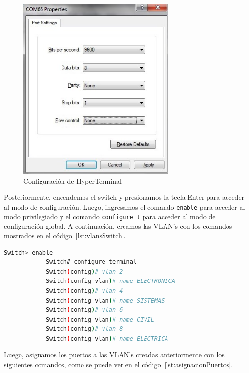         \begin{figure}[H]
            \centering
            \includegraphics[width=0.7\textwidth]{img/HyperTerminal.jpg}
            \caption{Configuración de HyperTerminal}
            \label{fig:HyperTerminal}
        \end{figure}

        Posteriormente, encendemos el switch y presionamos la tecla Enter para acceder al modo de configuración. Luego, ingresamos el comando \texttt{enable} para acceder al modo privilegiado y el comando \texttt{configure t} para acceder al modo de configuración global. A continuación, creamos las VLAN's con los comandos mostrados en el código~\ref{lst:vlansSwitch}.

        \begin{lstlisting}[language=bash, caption={Creación de las VLAN's en el Switch},label={lst:vlansSwitch}]
            Switch> enable
            Switch# configure terminal
            Switch(config)# vlan 2
            Switch(config-vlan)# name ELECTRONICA
            Switch(config)# vlan 4
            Switch(config-vlan)# name SISTEMAS
            Switch(config)# vlan 6
            Switch(config-vlan)# name CIVIL
            Switch(config)# vlan 8
            Switch(config-vlan)# name ELECTRICA
        \end{lstlisting}

        Luego, asignamos los puertos a las VLAN's creadas anteriormente con los siguientes comandos, como se puede ver en el código~\ref{lst:asignacionPuertos}.

